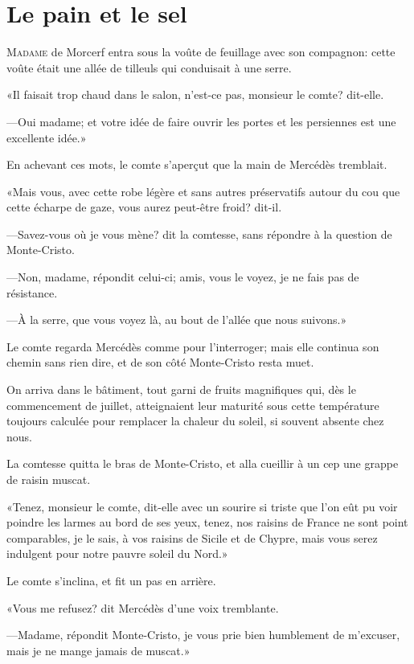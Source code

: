 \chapter{Le pain et le sel}

\lettrine{M}{adame} de Morcerf entra sous la voûte de feuillage avec son compagnon: cette voûte était une allée de tilleuls qui conduisait à une serre. 

\zz
«Il faisait trop chaud dans le salon, n'est-ce pas, monsieur le comte? dit-elle. 

—Oui madame; et votre idée de faire ouvrir les portes et les persiennes est une excellente idée.» 

En achevant ces mots, le comte s'aperçut que la main de Mercédès tremblait. 

«Mais vous, avec cette robe légère et sans autres préservatifs autour du cou que cette écharpe de gaze, vous aurez peut-être froid? dit-il.  

—Savez-vous où je vous mène? dit la comtesse, sans répondre à la question de Monte-Cristo. 

—Non, madame, répondit celui-ci; amis, vous le voyez, je ne fais pas de résistance. 

—À la serre, que vous voyez là, au bout de l'allée que nous suivons.» 

Le comte regarda Mercédès comme pour l'interroger; mais elle continua son chemin sans rien dire, et de son côté Monte-Cristo resta muet. 

On arriva dans le bâtiment, tout garni de fruits magnifiques qui, dès le commencement de juillet, atteignaient leur maturité sous cette température toujours calculée pour remplacer la chaleur du soleil, si souvent absente chez nous. 

La comtesse quitta le bras de Monte-Cristo, et alla cueillir à un cep une grappe de raisin muscat. 

«Tenez, monsieur le comte, dit-elle avec un sourire si triste que l'on eût pu voir poindre les larmes au bord de ses yeux, tenez, nos raisins de France ne sont point comparables, je le sais, à vos raisins de Sicile et de Chypre, mais vous serez indulgent pour notre pauvre soleil du Nord.» 

Le comte s'inclina, et fit un pas en arrière. 

«Vous me refusez? dit Mercédès d'une voix tremblante. 

—Madame, répondit Monte-Cristo, je vous prie bien humblement de m'excuser, mais je ne mange jamais de muscat.» 

